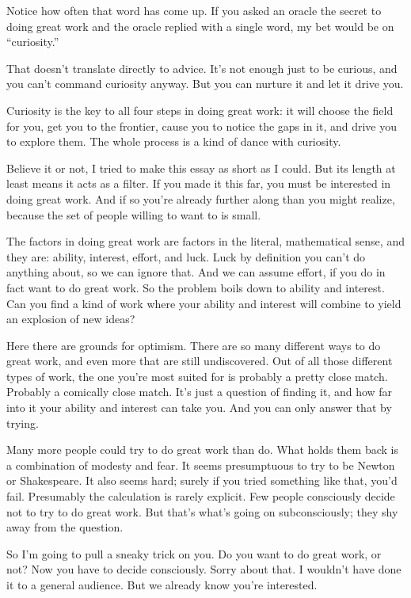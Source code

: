 Notice how often that word has come up. If you asked an oracle the
secret to doing great work and the oracle replied with a single word, my
bet would be on ``curiosity.''

That doesn't translate directly to advice. It's not enough just to be
curious, and you can't command curiosity anyway. But you can nurture it
and let it drive you.

Curiosity is the key to all four steps in doing great work: it will
choose the field for you, get you to the frontier, cause you to notice
the gaps in it, and drive you to explore them. The whole process is a
kind of dance with curiosity.

Believe it or not, I tried to make this essay as short as I could. But
its length at least means it acts as a filter. If you made it this far,
you must be interested in doing great work. And if so you're already
further along than you might realize, because the set of people willing
to want to is small.

The factors in doing great work are factors in the literal, mathematical
sense, and they are: ability, interest, effort, and luck. Luck by
definition you can't do anything about, so we can ignore that. And we
can assume effort, if you do in fact want to do great work. So the
problem boils down to ability and interest. Can you find a kind of work
where your ability and interest will combine to yield an explosion of
new ideas?

Here there are grounds for optimism. There are so many different ways to
do great work, and even more that are still undiscovered. Out of all
those different types of work, the one you're most suited for is
probably a pretty close match. Probably a comically close match. It's
just a question of finding it, and how far into it your ability and
interest can take you. And you can only answer that by trying.

Many more people could try to do great work than do. What holds them
back is a combination of modesty and fear. It seems presumptuous to try
to be Newton or Shakespeare. It also seems hard; surely if you tried
something like that, you'd fail. Presumably the calculation is rarely
explicit. Few people consciously decide not to try to do great work. But
that's what's going on subconsciously; they shy away from the question.

So I'm going to pull a sneaky trick on you. Do you want to do great
work, or not? Now you have to decide consciously. Sorry about that. I
wouldn't have done it to a general audience. But we already know you're
interested.


